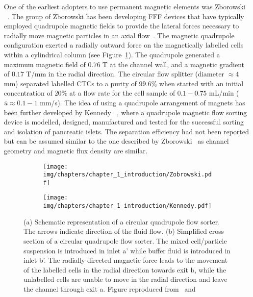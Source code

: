 One of the earliest adopters to use permanent magnetic elements was Zborowski \etal{}~\cite{Sun1998,Zborowski1999}. The group of Zborowski \etal{} has been developing FFF devices that have typically employed quadrupole magnetic fields to provide the lateral forces necessary to radially move magnetic particles in an axial flow~\cite{Zborowski2011a,Carpino2007,Williams2009}. The magnetic quadrupole configuration exerted a radially outward force on the magnetically labelled cells within a cylindrical column (see Figure~\ref{fig:Zobrowski1999}). The quadrupole generated a maximum magnetic field of $0.76$ T at the channel wall, and a magnetic gradient of $0.17$ T/mm in the radial direction. The circular flow splitter (diameter $\approx 4$ mm) separated labelled CTCs to a purity of $99.6\%$ when started with an initial concentration of $20\%$ at a flow rate for the cell sample of $0.1-0.75$ mL/min ($\bar{u}\approx 0.1-1$ mm/s). The idea of using a quadrupole arrangement of magnets has been further developed by Kennedy \etal{}~\cite{Kennedy2007}, where a quadrupole magnetic flow sorting device is modelled, designed, manufactured and tested for the successful sorting and isolation of pancreatic islets. The separation efficiency had not been reported but can be assumed similar to the one described by Zborowski~\etal{} as channel geometry and magnetic flux density are similar.

\begin{figure}[htb]
        \centering
        \begin{subfigure}[b]{0.45\textwidth}
                \texttt{[image: img/chapters/chapter\_1\_introduction/Zobrowski.pdf]}
                \caption{}    
                \label{fig:Zobrowski1999}
        \end{subfigure}
        \begin{subfigure}[b]{0.45\textwidth}
                \texttt{[image: img/chapters/chapter\_1\_introduction/Kennedy.pdf]}
                \caption{}    
                \label{fig:Kennedy2007}
        \end{subfigure}
        \caption[Circular quadrupole magnetic flow sorter]{(a) Schematic representation of a circular quadrupole flow sorter. The arrows indicate direction of the fluid flow. (b) Simplified cross section of a circular quadrupole flow sorter. The mixed cell/particle suspension is introduced in inlet a' while buffer fluid is introduced in inlet b'. The radially directed magnetic force leads to the movement of the labelled cells in the radial direction towards exit b, while the unlabelled cells are unable to move in the radial direction and leave the channel through exit a. Figure reproduced from~\cite{Zborowski1999} and~\cite{Kennedy2007}}
        \label{fig:quadrupoleMagneticFlowSorter}
\end{figure}

